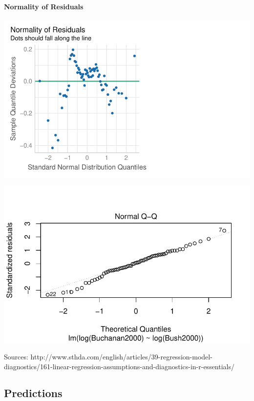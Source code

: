 \documentclass[
  letterpaper,
  DIV=11,
  numbers=noendperiod]{scrartcl}
\let\oldparagraph\paragraph
\renewcommand{\paragraph}[1]{\oldparagraph{#1}\mbox{}}
\begin{document}
\hypertarget{normality-of-residuals}{%
\paragraph{Normality of Residuals}\label{normality-of-residuals}}

\includegraphics{sds-291_s-24_case-study-template_files/figure-pdf/unnamed-chunk-9-1.pdf}

\includegraphics{sds-291_s-24_case-study-template_files/figure-pdf/unnamed-chunk-9-2.pdf}

Sources:
http://www.sthda.com/english/articles/39-regression-model-diagnostics/161-linear-regression-assumptions-and-diagnostics-in-r-essentials/

\hypertarget{predictions}{%
\subsection{Predictions}\label{predictions}}
\end{document}
